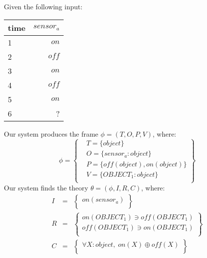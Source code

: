
Given the following input:
\begin{table}[ht!]
\begin{center}
\begin{tabular}{|l|r|}
\hline
time & $\mathit{sensor}_a$\\
\hline
1 & $\mathit{on}$ \\
2 & $\mathit{off}$ \\
3 & $\mathit{on}$ \\
4 & $\mathit{off}$ \\
5 & $\mathit{on}$ \\
6 & ? \\
\hline
\end{tabular}
\end{center}
\end{table}

Our system produces the frame $\phi = (T, O, P, V)$, where:
\begin{equation*}
\phi = \left \{
\begin{aligned}
& T = \{ 
object
\}\\
& O = \{
\mathit{sensor}_a: object
\}\\
& P = \{
\mathit{off}(object),\mathit{on}(object)
\}\\
& V = \{
OBJECT_1: object
\}\\
\end{aligned}\right\}
\end{equation*}
Our system finds the theory $\theta = (\phi, I, R, C)$, where:
\begin{eqnarray*}
I & = & \left\{ \begin{array}{l}
\mathit{on}(\mathit{sensor}_a)\\
\end{array}\right\}\\
R & = &  \left\{ \begin{array}{l}
\mathit{on}(\mathit{OBJECT}_1) \ni \mathit{off}(\mathit{OBJECT}_1)\\
\mathit{off}(\mathit{OBJECT}_1) \ni \mathit{on}(\mathit{OBJECT}_1)\\
\end{array}\right\}\\
C & = & \left\{ \begin{array}{l}
\forall X : object,\;\mathit{on}(X) \oplus \mathit{off}(X)\\
\end{array}\right\}\\
\end{eqnarray*}

